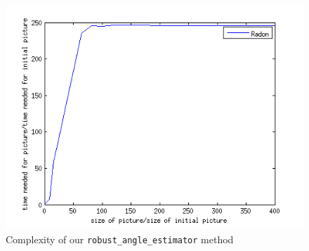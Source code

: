 \begin{figure}[h!]
\centering
\includegraphics[scale=0.7]{../Images/ComplexityRadon.png}
\caption{Complexity of our \texttt{robust\_angle\_estimator} method}
\label{fig:ComplexityRadon}
\end{figure}

%
%
%
%
%
%
%



